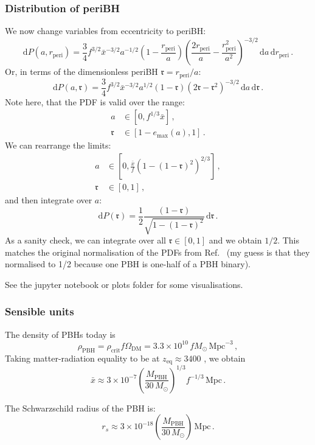 \documentclass[a4paper,11pt]{article}
\newcommand{\rperi}{r_\mathrm{peri}}
\begin{document}
\subsubsection*{Distribution of periBH}

We now change variables from eccentricity to periBH:
\begin{equation}
\mathrm{d}P(a, \rperi) = \frac{3}{4} f^{3/2} \bar{x}^{-3/2} a^{-1/2} \left(1-\frac{\rperi}{a}\right)\left(\frac{2\rperi}{a} - \frac{\rperi^2}{a^2}\right)^{-3/2}\,\mathrm{d}a\,\mathrm{d}\rperi\,.
\end{equation}
Or, in terms of the dimensionless periBH $\mathfrak{r} = \rperi/a$:
\begin{equation}
\mathrm{d}P(a, \mathfrak{r}) = \frac{3}{4} f^{3/2} \bar{x}^{-3/2} a^{1/2} \left(1-\mathfrak{r}\right)\left(2 \mathfrak{r} - \mathfrak{r}^2\right)^{-3/2}\,\mathrm{d}a\,\mathrm{d}\mathfrak{r}\,.
\end{equation}
Note here, that the PDF is valid over the range:
\begin{align}
a &\in [0, f^{1/3} \bar{x}]\,,\\
\mathfrak{r} &\in [1 - e_\mathrm{max}(a), 1]\,.
\end{align}
We can rearrange the limits:
\begin{align}
a &\in [0, \frac{\bar{x}}{f} \left(1 - (1-\mathfrak{r})^2\right)^{2/3}]\,,\\
\mathfrak{r} &\in [0, 1]\,,
\end{align}
and then integrate over $a$:
\begin{equation}
\mathrm{d}P(\mathfrak{r}) = \frac{1}{2} \frac{\left(1-\mathfrak{r}\right)}{\sqrt{1- (1-\mathfrak{r})^2}}\,\mathrm{d}\mathfrak{r}\,.
\end{equation}
As a sanity check, we can integrate over all $\mathfrak{r} \in [0, 1]$ and we obtain $1/2$. This matches the original normalisation of the PDFs from Ref.~\cite{Sasaki:2016jop} (my guess is that they normalised to 1/2 because one PBH is one-half of a PBH binary).

See the jupyter notebook or plots folder for some visualisations.

\subsubsection*{Sensible units}

The density of PBHs today is \cite{Lahav:2014vza,Ade:2015xua}
\begin{equation}
\rho_{\mathrm{PBH}} = \rho_\mathrm{crit} f \Omega_{\mathrm{DM}} = 3.3 \times 10^{10} \, f M_\odot \, \mathrm{Mpc}^{-3}\,,
\end{equation}
Taking matter-radiation equality to be at $z_\mathrm{eq} \approx 3400$ \cite{Ade:2015xua}, we obtain
\begin{equation}
\bar{x} \approx 3 \times 10^{-7} \left( \frac{M_{\mathrm{PBH}}}{30 \,M_\odot}\right)^{1/3}{f}^{-1/3} \, \mathrm{Mpc}\,.
\end{equation}

The Schwarzschild radius of the PBH is:
\begin{equation}
r_s \approx 3 \times 10^{-18} \left( \frac{M_{\mathrm{PBH}}}{30 \,M_\odot}\right)\,\mathrm{Mpc}\,.
\end{equation}



\end{document}
